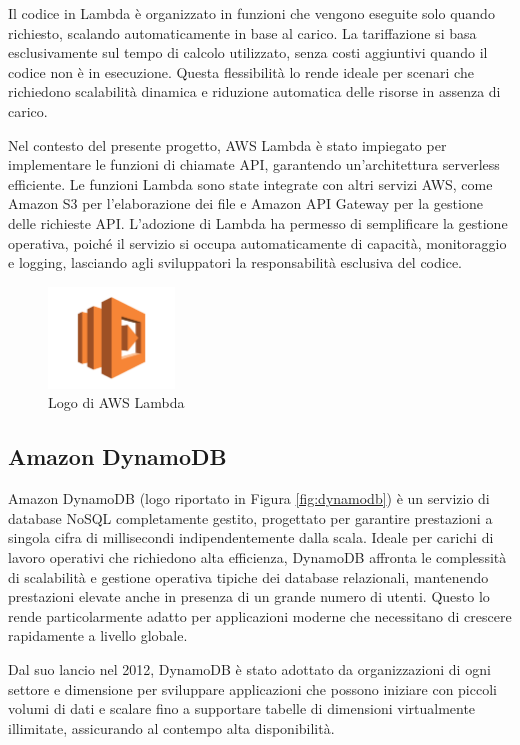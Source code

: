 Il codice in Lambda è organizzato in funzioni che vengono eseguite solo quando richiesto, scalando automaticamente in base al carico. La tariffazione si basa esclusivamente sul tempo di calcolo utilizzato, senza costi aggiuntivi quando il codice non è in esecuzione. Questa flessibilità lo rende ideale per scenari che richiedono scalabilità dinamica e riduzione automatica delle risorse in assenza di carico.

Nel contesto del presente progetto, AWS Lambda è stato impiegato per implementare le funzioni di chiamate API, garantendo un'architettura serverless efficiente. Le funzioni Lambda sono state integrate con altri servizi AWS, come Amazon S3 per l'elaborazione dei file e Amazon API Gateway per la gestione delle richieste API. L'adozione di Lambda ha permesso di semplificare la gestione operativa, poiché il servizio si occupa automaticamente di capacità, monitoraggio e logging, lasciando agli sviluppatori la responsabilità esclusiva del codice.


\begin{figure}[h]
  \centering
  \includegraphics[width=0.3\textwidth]{img/tecnologie/AWS_Lambda.png}
  \caption{Logo di AWS Lambda}
  \label{fig:lambda}
\end{figure}

\subsection{Amazon DynamoDB}
Amazon DynamoDB (logo riportato in Figura \ref{fig:dynamodb}) è un servizio di database NoSQL completamente gestito, progettato per garantire prestazioni a singola cifra di millisecondi indipendentemente dalla scala. Ideale per carichi di lavoro operativi che richiedono alta efficienza, DynamoDB affronta le complessità di scalabilità e gestione operativa tipiche dei database relazionali, mantenendo prestazioni elevate anche in presenza di un grande numero di utenti. Questo lo rende particolarmente adatto per applicazioni moderne che necessitano di crescere rapidamente a livello globale.

Dal suo lancio nel 2012, DynamoDB è stato adottato da organizzazioni di ogni settore e dimensione per sviluppare applicazioni che possono iniziare con piccoli volumi di dati e scalare fino a supportare tabelle di dimensioni virtualmente illimitate, assicurando al contempo alta disponibilità.

